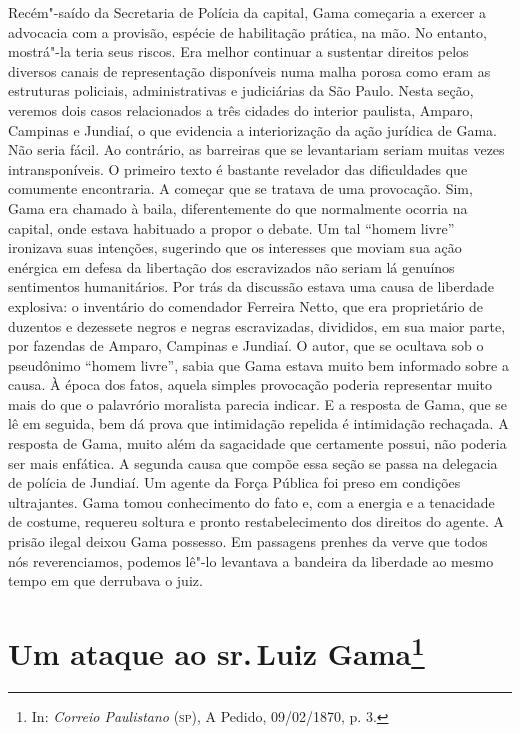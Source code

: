 {\footnotesize\noindent
Recém"-saído da Secretaria de Polícia da capital, Gama começaria a
exercer a advocacia com a provisão, espécie de habilitação prática, na
mão. No entanto, mostrá"-la teria seus riscos. Era melhor continuar a
sustentar direitos pelos diversos canais de representação disponíveis numa malha
porosa como eram as estruturas policiais, administrativas e judiciárias
da São Paulo. Nesta seção, veremos dois casos
relacionados a três cidades do interior paulista, Amparo,
Campinas e Jundiaí, o que evidencia a interiorização da ação jurídica
de Gama. Não seria fácil. Ao contrário, as barreiras que se levantariam
seriam muitas vezes intransponíveis. O primeiro texto é bastante
revelador das dificuldades que comumente encontraria. A começar que se
tratava de uma provocação. Sim, Gama era chamado à baila, diferentemente
do que normalmente ocorria na capital, onde estava habituado a propor o
debate. Um tal ``homem livre'' ironizava suas intenções, sugerindo que os
interesses que moviam sua ação enérgica em defesa da libertação dos
escravizados não seriam lá genuínos sentimentos humanitários.
Por trás da discussão estava uma causa de
liberdade explosiva: o inventário do comendador Ferreira Netto, que era
proprietário de duzentos e
dezessete negros e negras escravizadas, divididos, em sua maior parte,
por fazendas de Amparo, Campinas e Jundiaí. O autor, que se ocultava sob
o pseudônimo ``homem livre'', sabia que Gama estava muito bem informado
sobre a causa. À época dos fatos, aquela simples provocação poderia
representar muito mais do que o palavrório moralista parecia indicar. E
a resposta de Gama, que se lê em seguida, bem dá prova que intimidação
repelida é intimidação rechaçada. A resposta de Gama, muito além da
sagacidade que certamente possui, não poderia ser mais enfática. A
segunda causa que compõe essa seção se passa na delegacia de polícia de
Jundiaí. Um agente da Força Pública
foi preso em condições ultrajantes. Gama tomou conhecimento do
fato e, com a energia e a tenacidade de costume, requereu soltura e
pronto restabelecimento dos direitos do agente.
A prisão ilegal deixou Gama possesso.
Em passagens prenhes da verve que todos nós reverenciamos, podemos lê"-lo
levantava a bandeira da liberdade ao mesmo tempo em que derrubava o juiz.}
\@openrighttrue\makeatother \endgroup


\chapter{Um ataque ao sr.\,Luiz Gama\footnote[*]{In: \emph{Correio Paulistano}
  (\textsc{sp}), A Pedido, 09/02/1870, p. 3.}} %

